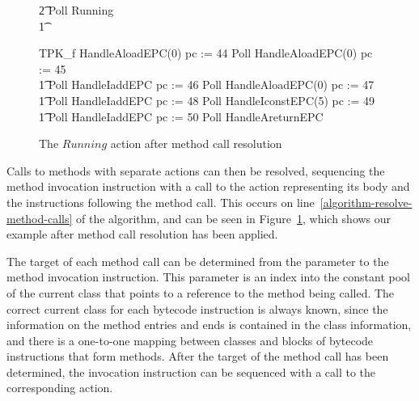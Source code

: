 \begin{figure}[t]
\begin{circus}
    \t2 \circfi \circseq Poll \circseq Running \\
    \t1 \circfi
  \end{circus}
  \begin{circus}
    TPK\_f \circdef HandleAloadEPC(0) \circseq pc := 44 \circseq Poll \circseq HandleAloadEPC(0) \circseq pc := 45 \circseq \\
    \t1 Poll \circseq HandleIaddEPC \circseq pc := 46 \circseq Poll \circseq HandleAloadEPC(0) \circseq pc := 47 \circseq \\
    \t1 Poll \circseq HandleIaddEPC \circseq pc := 48 \circseq Poll \circseq HandleIconstEPC(5) \circseq pc := 49 \circseq \\
    \t1 Poll \circseq HandleIaddEPC \circseq pc := 50 \circseq Poll \circseq HandleAreturnEPC
  \end{circus}
  \caption{The $Running$ action after method call resolution}
  \label{method-call-resolution-example-figure}
\end{figure}

Calls to methods with separate actions can then be resolved,
sequencing the method invocation instruction with a call to the
\Circus{} action representing its body and the instructions following
the method call. 
This occurs on line~\ref{algorithm-resolve-method-calls} of the
algorithm, and can be seen in
Figure~\ref{method-call-resolution-example-figure}, which shows our
example after method call resolution has been applied.

The target of each method call can be determined from the parameter to
the method invocation instruction.
This parameter is an index into the constant pool of the current class
that points to a reference to the method being called.
The correct current class for each bytecode instruction is always
known, since the information on the method entries and ends is
contained in the class information, and there is a one-to-one mapping
between classes and blocks of bytecode instructions that form methods.
After the target of the method call has been determined, the
invocation instruction can be sequenced with a call to the
corresponding \Circus{} action.


